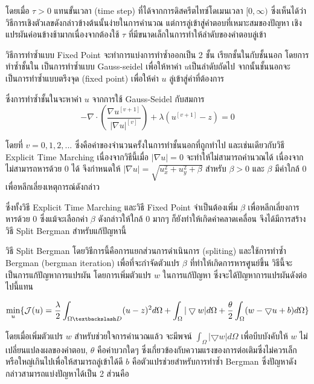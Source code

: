 \documentclass[hidelinks,a4paper,14pt]{article}
\numberwithin{equation}{section}							%
\begin{document}
{โดยเมื่อ $\tau>0$ แทนขั้นเวลา (time step) ที่ได้จากการดิสครีตไทซ์โดเมนเวลา $[0,\infty)$ ซึ่งเห็นได้ว่าวิธีการเชิงตัวเลขดังกล่าวข้างต้นนั้นง่ายในการคํานวณ แต่การลู่เข้าสู่คําตอบที่เหมาะสมของปัญหา เชิงแปรผันค่อนข้างช้ามากเนื่องจากต้องใช้ $\tau$ ที่มีขนาดเล็กในการทำให้ลำดับของคำตอบลู่เข้า 

\hspace{1cm}วิธีการทำซ้ำแบบ Fixed Point \cite{ref:FixpointSolver} จะทำการแบ่งการทำซ้ำออกเป็น  2 ชั้น เรียกชั้นในกับชั้นนอก โดยการทำซ้ำชั้นใน เป็นการทำซ้ำแบบ Gauss-seidel เพื่อให้หาค่า $u$เป็นลำดับถัดไป จากนั้นชั้นนอกจะเป็นการทำซ้ำแบบตรึงจุด (fixed point) เพื่อให้ค่า $u$ ลู่เข้าสู่ค่าที่ต้องการ 

\hspace{1cm}ซึ่งการทำซ้ำชั้นในจะหาค่า $u$ จากการใช้ Gauss-Seidel กับสมการ
$$
- \nabla\cdot\left(\frac{\nabla u^{[v+1]}}{{\lvert \nabla u \rvert}^{[v]} }\right) + \lambda(u^{[v+1]}-z)  = 0
$$

โดยที่ $v = 0,1,2,... $ ซึ่งคือค่าของจำนวนครั้งในการทำชั้นนอกที่ถูกทำไป และเช่นเดียวกับวิธี Explicit Time Marching เนื่องจากวิธีนี้เมื่อ $\lvert \nabla u \rvert  = 0 $ จะทำให้ไม่สามารถคำนวณได้ เนื่องจากไม่สามารถหารด้วย 0 ได้ จึงกำหนดให้ $\lvert \nabla u \rvert = \sqrt{u_x^2+u_y^2 + \beta}$ สำหรับ $\beta > 0$ และ $\beta$ มีค่าใกล้ 0 เพื่อหลีกเลี่ยงเหตุการณ์ดังกล่าว

\hspace{1cm} ซึ่งทั้งวิธี Explicit Time Marching และวิธี Fixed Point จำเป็นต้องเพิ่ม $\beta$ เพื่อหลีกเลี่ยงการหารด้วย 0 ซึ่งแม้จะเลือกค่า $\beta$  ดังกล่าวให้ใกล้ 0 มากๆ ก็ยังทำให้เกิดค่าคลาดเคลื่อน  จึงได้มีการสร้างวิธี Split Bergman สำหรับแก้ปัญหานี้

\hspace{1cm} วิธี Split Bergman \cite{ref:splitbergman-inpaint} โดยวิธีการนี้คือการแยกส่วนการดำเนินการ (spliting) และใช้การทำซ้ำ Bergman (bergman iteration)  เพื่อที่จะกำจัดตัวแปร $\beta$ ที่ทำให้เกิดการหารศูนย์ขึ้น วิธีนี้จะเป็นการแก้ปัญหาการแปรผัน โดยการเพิ่มตัวแปร $w$ ในการแก้ปัญหา ซึ่งจะได้ปัญหาการแปรผันดังต่อไปนี้แทน

$$\min_{u} \{ \mathcal{J}(u) = \frac{\lambda}{2} \int_{\Omega \textbackslash D} (u-z)^2 d\Omega +  \int_{\Omega}  |\bigtriangledown w|  d\Omega + \frac{\theta}{2} \int_{\Omega} (w - \bigtriangledown u + b) d\Omega \}$$

โดยเมื่อเพิ่มตัวแปร $w$ สำหรับช่วยใจการคำนวณแล้ว จะมีพจน์ $ \int_{\Omega}  |\bigtriangledown w|  d\Omega$ เพื่อบีบบังคับให้ $w$ ไม่เปลี่ยนแปลงผลของคำตอบ, $\theta$ คือค่าบวกใดๆ ซึ่งเกี่ยวข้องกับความแรงของการต่อเติมซึ่งไม่ควรเล็กหรือใหญ่เกินไปเพื่อให้สามารถลู่เข้าได้ดี $b$ คือตัวแปรช่วยสำหรับการทำซ้ำ Bergman ซึ่งปัญหาดังกล่าวสามารถแบ่งปัญหาได้เป็น 2 ส่วนคือ

}
\end{document}
